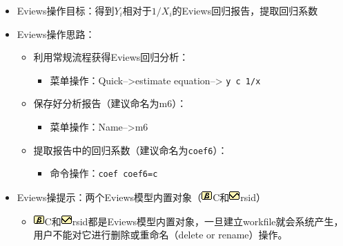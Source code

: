 \documentclass[12pt,(landscape,a4paper),(portrait,a4paper)]{article}
\providecommand{\tightlist}{%
  \setlength{\itemsep}{0pt}\setlength{\parskip}{0pt}}
\begin{document}
\begin{itemize}
\item
  Eviews操作目标：得到\(Y_i\)相对于\(1/X_i\)的Eviews回归报告，提取回归系数
\item
  Eviews操作思路：

  \begin{itemize}
  \item
    利用常规流程获得Eviews回归分析：

    \begin{itemize}
    \tightlist
    \item
      菜单操作：Quick--\textgreater{}estimate equation--\textgreater{}
      \texttt{y\ c\ 1/x}
    \end{itemize}
  \item
    保存好分析报告（建议命名为m6）：

    \begin{itemize}
    \tightlist
    \item
      菜单操作：Name--\textgreater{}m6
    \end{itemize}
  \item
    提取报告中的回归系数（建议命名为\texttt{coef6}）：

    \begin{itemize}
    \tightlist
    \item
      命令操作：\texttt{coef\ coef6=c}
    \end{itemize}
  \end{itemize}
\item
  Eviews操提示：两个Eviews模型内置对象（\includegraphics{picture/object/Beta.png}C和\includegraphics{picture/object/Series.png}rsid）

  \begin{itemize}
  \item
    \includegraphics{picture/object/Beta.png}C和\includegraphics{picture/object/Series.png}rsid都是Eviews模型内置对象，一旦建立workfile就会系统产生，用户不能对它进行删除或重命名（delete
    or rename）操作。


\end{itemize}
\end{itemize}
\end{document}
